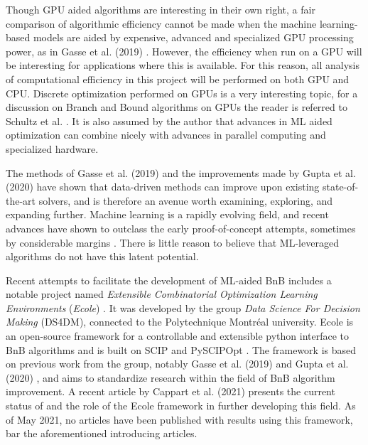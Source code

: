Though \gls{GPU} aided algorithms are interesting in their own right, a fair comparison of algorithmic efficiency cannot be made when the machine learning-based models are aided by expensive, advanced and specialized \gls{GPU} processing power, as in Gasse et al. (2019) \cite{gasse2019exact}. However, the efficiency when run on a \gls{GPU} will be interesting for applications where this is available. 
For this reason, all analysis of computational efficiency in this project will be performed on both \gls{GPU} and \gls{CPU}. Discrete optimization performed on \gls{GPU}s is a very interesting topic, for a discussion on Branch and Bound algorithms on \gls{GPU}s the reader is referred to Schultz et al. \cite{schulz2013gpu}. It is also assumed by the author that advances in ML aided optimization can combine nicely with advances in parallel computing and specialized hardware.

The methods of Gasse et al. (2019) \cite{gasse2019exact} and the improvements made by Gupta et al. (2020) \cite{gupta2020hybrid} have shown that data-driven methods can improve upon existing state-of-the-art solvers, and is therefore an avenue worth examining, exploring, and expanding further. Machine learning is a rapidly evolving field, and recent advances have shown to outclass the early proof-of-concept attempts, sometimes by considerable margins \cite{holzinger2018current}. There is little reason to believe that \gls{ML}-leveraged algorithms do not have this latent potential. %

Recent attempts to facilitate the development of \gls{ML}-aided \gls{BnB} includes a notable project named \textit{Extensible Combinatorial Optimization Learning Environments} (\emph{Ecole}) \cite{prouvost2020ecole, prouvost2021ecole}. It was developed by the group \textit{Data Science For Decision Making} (\gls{DS4DM}), connected to the Polytechnique Montr\'{e}al university. \gls{Ecole} is an open-source framework for a controllable and extensible python interface to \gls{BnB} algorithms and is built on \gls{SCIP} and PySCIPOpt \cite{prouvost2020ecole}. The framework is based on previous work from the group, notably Gasse et al. (2019) \cite{gasse2019exact} and Gupta et al. (2020) \cite{gupta2020hybrid}, and aims to standardize research within the field of \gls{BnB} algorithm improvement.  
 A recent article by
Cappart et al. (2021) \cite{cappart2021combinatorial} presents the current status of and the role of the \gls{Ecole} framework in further developing this field. 
As of May 2021, no articles have been published with results using this framework, bar the aforementioned introducing articles.



